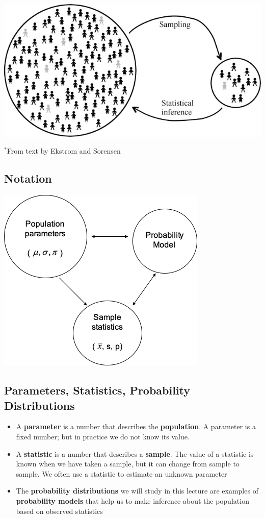 \documentclass[
]{book}
\providecommand{\tightlist}{%
  \setlength{\itemsep}{0pt}\setlength{\parskip}{0pt}}
\begin{document}
\includegraphics[width=0.5\linewidth]{./2_33}

\(^*\)From text by Ekstrom and Sorensen

\hypertarget{notation}{%
\subsection{Notation}\label{notation}}

\includegraphics[width=0.5\linewidth]{./2_34}

\hypertarget{parameters-statistics-probability-distributions}{%
\subsection{Parameters, Statistics, Probability Distributions}\label{parameters-statistics-probability-distributions}}

\begin{itemize}
\tightlist
\item
  A \textbf{parameter} is a number that describes the \textbf{population}. A parameter is a fixed number; but in practice we do not know its value.
\item
  A \textbf{statistic} is a number that describes a \textbf{sample}. The value of a statistic is known when we have taken a sample, but it can change from sample to sample. We often use a statistic to estimate an unknown parameter
\item
  The \textbf{probability distributions} we will study in this lecture are examples of \textbf{probability models} that help us to make inference about the population based on observed statistics
\end{itemize}
\end{document}
